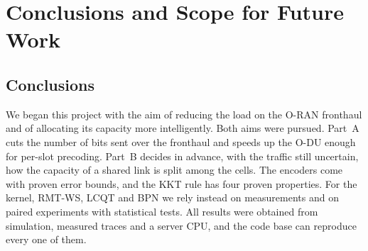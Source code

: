 \chapter{Conclusions and Scope for Future Work}
\label{ch:concl}
\thispagestyle{plain}

\section{Conclusions}

We began this project with the aim of reducing the load on the O-RAN fronthaul and of allocating its capacity more intelligently. Both aims were pursued. Part~A cuts the number of bits sent over the fronthaul and speeds up the O-DU enough for per-slot precoding. Part~B decides in advance, with the traffic still uncertain, how the capacity of a shared link is split among the cells. The encoders come with proven error bounds, and the KKT rule has four proven properties. For the kernel, RMT-WS, LCQT and BPN we rely instead on measurements and on paired experiments with statistical tests. All results were obtained from simulation, measured traces and a server CPU, and the code base can reproduce every one of them.

